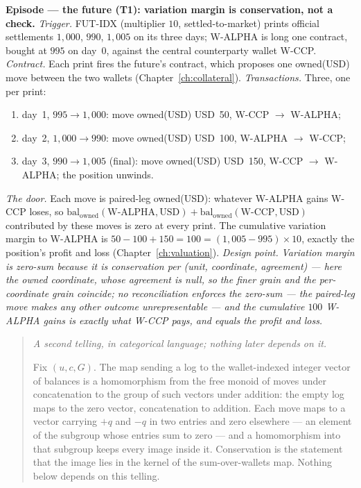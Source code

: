 \documentclass[11pt,a4paper]{article}
\newcommand{\USD}[1]{\mbox{USD~#1}}
\newenvironment{secondtelling}%
  {\par\medskip\noindent\begin{quote}\small\emph{A second telling, in categorical language; nothing later depends on it.}\par\smallskip}%
  {\end{quote}\medskip}
\begin{document}
\medskip\noindent\textbf{Episode --- the future (T1): variation margin is
conservation, not a check.}
\emph{Trigger.} FUT-IDX (multiplier $10$, settled-to-market) prints official
settlements $1{,}000$, $990$, $1{,}005$ on its three days; W-ALPHA is long one
contract, bought at $995$ on day~0, against the central counterparty wallet
W-CCP. \emph{Contract.} Each print fires the future's contract, which proposes one
owned(USD) move between the two wallets (Chapter~\ref{ch:collateral}).
\emph{Transactions.} Three, one per print:
\begin{enumerate}[label=(\arabic*),nosep,leftmargin=2.2em]
\item day~1, $995\!\to\!1{,}000$: move owned(USD) \USD{50}, W-CCP $\to$ W-ALPHA;
\item day~2, $1{,}000\!\to\!990$: move owned(USD) \USD{100}, W-ALPHA $\to$ W-CCP;
\item day~3, $990\!\to\!1{,}005$ (final): move owned(USD) \USD{150}, W-CCP $\to$
  W-ALPHA; the position unwinds.
\end{enumerate}
\emph{The door.} Each move is paired-leg owned(USD): whatever W-ALPHA gains W-CCP
loses, so $\mathrm{bal}_{\text{owned}}(\text{W-ALPHA},\text{USD}) +
\mathrm{bal}_{\text{owned}}(\text{W-CCP},\text{USD})$ contributed by these moves is
zero at every print. The cumulative variation margin to W-ALPHA is
$50-100+150 = 100 = (1{,}005-995)\times 10$, exactly the position's profit and
loss (Chapter~\ref{ch:valuation}).
\emph{Design point.} \emph{Variation margin is zero-sum because it is
conservation per (unit, coordinate, agreement) --- here the owned coordinate, whose
agreement is null, so the finer grain and the per-coordinate grain coincide; no
reconciliation enforces the zero-sum ---
the paired-leg move makes any other outcome unrepresentable --- and the cumulative
$100$ W-ALPHA gains is exactly what W-CCP pays, and equals the profit and loss.}

\begin{secondtelling}
Fix $(u,c,G)$. The map sending a log to the wallet-indexed integer vector of
balances is a homomorphism from the free monoid of moves under concatenation to
the group of such vectors under addition: the empty log maps to the zero vector,
concatenation to addition. Each move maps to a vector carrying $+q$ and $-q$ in
two entries and zero elsewhere --- an element of the subgroup whose entries sum to
zero --- and a homomorphism into that subgroup keeps every image inside it.
Conservation is the statement that the image lies in the kernel of the
sum-over-wallets map. Nothing below depends on this telling.
\end{secondtelling}
\end{document}

